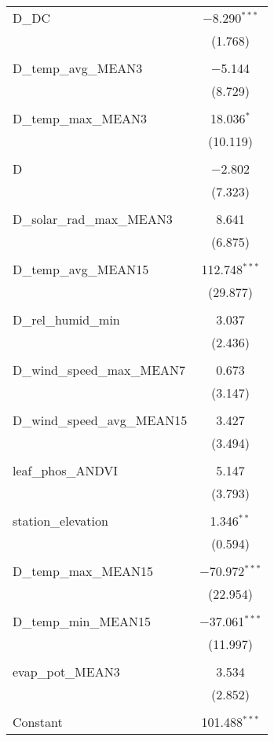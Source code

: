 \begin{table}[!htbp]
\begin{tabular}{@{\extracolsep{5pt}}lc}
 D\_DC & $-$8.290$^{***}$ \\ 
  & (1.768) \\ 
  & \\ 
 D\_temp\_avg\_MEAN3 & $-$5.144 \\ 
  & (8.729) \\ 
  & \\ 
 D\_temp\_max\_MEAN3 & 18.036$^{*}$ \\ 
  & (10.119) \\ 
  & \\ 
 D & $-$2.802 \\ 
  & (7.323) \\ 
  & \\ 
 D\_solar\_rad\_max\_MEAN3 & 8.641 \\ 
  & (6.875) \\ 
  & \\ 
 D\_temp\_avg\_MEAN15 & 112.748$^{***}$ \\ 
  & (29.877) \\ 
  & \\ 
 D\_rel\_humid\_min & 3.037 \\ 
  & (2.436) \\ 
  & \\ 
 D\_wind\_speed\_max\_MEAN7 & 0.673 \\ 
  & (3.147) \\ 
  & \\ 
 D\_wind\_speed\_avg\_MEAN15 & 3.427 \\ 
  & (3.494) \\ 
  & \\ 
 leaf\_phos\_ANDVI & 5.147 \\ 
  & (3.793) \\ 
  & \\ 
 station\_elevation & 1.346$^{**}$ \\ 
  & (0.594) \\ 
  & \\ 
 D\_temp\_max\_MEAN15 & $-$70.972$^{***}$ \\ 
  & (22.954) \\ 
  & \\ 
 D\_temp\_min\_MEAN15 & $-$37.061$^{***}$ \\ 
  & (11.997) \\ 
  & \\ 
 evap\_pot\_MEAN3 & 3.534 \\ 
  & (2.852) \\ 
  & \\ 
 Constant & 101.488$^{***}$ \\ 

\end{tabular}
\end{table}

